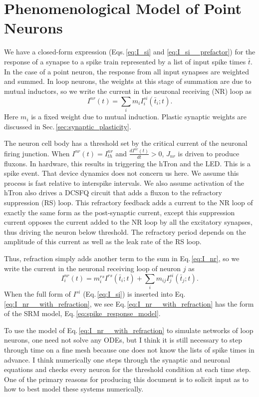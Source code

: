 \documentclass[]{article}
\begin{document}
\section{\label{sec:neurons}Phenomenological Model of Point Neurons}
We have a closed-form expression (Eqs.\,\ref{eq:I_si} and \ref{eq:I_si__prefactor}) for the response of a synapse to a spike train represented by a list of input spike times $\bar{t}$. In the case of a point neuron, the response from all input synapses are weighted and summed. In loop neurons, the weights at this stage of summation are due to mutual inductors, so we write the current in the neuronal receiving (NR) loop as
\begin{equation}
\label{eq:I_nr}
I^{nr}(t) = \sum_i m_i I_i^{si}(\bar{t}_i;t).
\end{equation}
Here $m_i$ is a fixed weight due to mutual induction. Plastic synaptic weights are discussed in Sec.\,\ref{sec:synaptic_plasticity}. 

The neuron cell body has a threshold set by the critical current of the neuronal firing junction. When $I^{nr}(t) = I^{nr}_{th}$ and $\frac{dI^{nr}(t)}{dt} > 0$, $J_{nr}$ is driven to produce fluxons. In hardware, this results in triggering the hTron and the LED. This is a spike event. That device dynamics does not concern us here. We assume this process is fast relative to interspike intervals. We also assume activation of the hTron also drives a DCSFQ circuit that adds a fluxon to the refractory suppression (RS) loop. This refractory feedback adds a current to the NR loop of exactly the same form as the post-synaptic current, except this suppression current opposes the current added to the NR loop by all the excitatory synapses, thus driving the neuron below threshold. The refractory period depends on the amplitude of this current as well as the leak rate of the RS loop.

Thus, refraction simply adds another term to the sum in Eq.\,\ref{eq:I_nr}, so we write the current in the neuronal receiving loop of neuron $j$ as
\begin{equation}
\label{eq:I_nr__with_refraction}
I_i^{nr}(t) = m_i^{rs}I^{rs}(\bar{t}_i;t)+\sum_i m_{ij} I_j^{si}(\bar{t}_j;t).
\end{equation}
When the full form of $I^{si}$ (Eq.\,\ref{eq:I_si}) is inserted into Eq.\,\ref{eq:I_nr__with_refraction}, we see Eq.\,\ref{eq:I_nr__with_refraction} has the form of the SRM model, Eq.\,\ref{eq:spike_response_model}.

To use the model of Eq.\,\ref{eq:I_nr__with_refraction} to simulate networks of loop neurons, one need not solve any ODEs, but I think it is still necessary to step through time on a fine mesh because one does not know the lists of spike times in advance. I think numerically one steps through the synaptic and neuronal equations and checks every neuron for the threshold condition at each time step. One of the primary reasons for producing this document is to solicit input as to how to best model these systems numerically.
\end{document}
